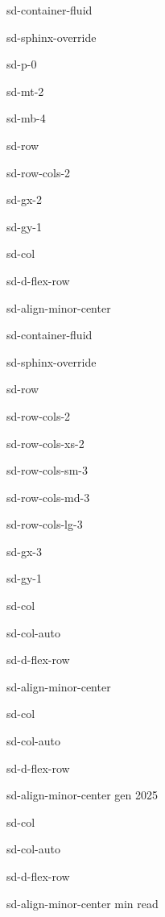 \documentclass[letterpaper,10pt,italian]{jupyterBook}
\begin{document}
\begin{sphinxuseclass}{sd-container-fluid}
\begin{sphinxuseclass}{sd-sphinx-override}
\begin{sphinxuseclass}{sd-p-0}
\begin{sphinxuseclass}{sd-mt-2}
\begin{sphinxuseclass}{sd-mb-4}
\begin{sphinxuseclass}{sd-row}
\begin{sphinxuseclass}{sd-row-cols-2}
\begin{sphinxuseclass}{sd-gx-2}
\begin{sphinxuseclass}{sd-gy-1}
\begin{sphinxuseclass}{sd-col}
\begin{sphinxuseclass}{sd-d-flex-row}
\begin{sphinxuseclass}{sd-align-minor-center}
\begin{sphinxuseclass}{sd-container-fluid}
\begin{sphinxuseclass}{sd-sphinx-override}
\begin{sphinxuseclass}{sd-row}
\begin{sphinxuseclass}{sd-row-cols-2}
\begin{sphinxuseclass}{sd-row-cols-xs-2}
\begin{sphinxuseclass}{sd-row-cols-sm-3}
\begin{sphinxuseclass}{sd-row-cols-md-3}
\begin{sphinxuseclass}{sd-row-cols-lg-3}
\begin{sphinxuseclass}{sd-gx-3}
\begin{sphinxuseclass}{sd-gy-1}
\begin{sphinxuseclass}{sd-col}
\begin{sphinxuseclass}{sd-col-auto}
\begin{sphinxuseclass}{sd-d-flex-row}
\begin{sphinxuseclass}{sd-align-minor-center}
\end{sphinxuseclass}
\end{sphinxuseclass}
\end{sphinxuseclass}
\end{sphinxuseclass}
\begin{sphinxuseclass}{sd-col}
\begin{sphinxuseclass}{sd-col-auto}
\begin{sphinxuseclass}{sd-d-flex-row}
\begin{sphinxuseclass}{sd-align-minor-center}
 gen 2025

\end{sphinxuseclass}
\end{sphinxuseclass}
\end{sphinxuseclass}
\end{sphinxuseclass}
\begin{sphinxuseclass}{sd-col}
\begin{sphinxuseclass}{sd-col-auto}
\begin{sphinxuseclass}{sd-d-flex-row}
\begin{sphinxuseclass}{sd-align-minor-center}
 min read


\end{sphinxuseclass}
\end{sphinxuseclass}
\end{sphinxuseclass}
\end{sphinxuseclass}
\end{sphinxuseclass}
\end{sphinxuseclass}
\end{sphinxuseclass}
\end{sphinxuseclass}
\end{sphinxuseclass}
\end{sphinxuseclass}
\end{sphinxuseclass}
\end{sphinxuseclass}
\end{sphinxuseclass}
\end{sphinxuseclass}
\end{sphinxuseclass}
\end{sphinxuseclass}
\end{sphinxuseclass}
\end{sphinxuseclass}
\end{sphinxuseclass}
\end{sphinxuseclass}
\end{sphinxuseclass}
\end{sphinxuseclass}
\end{sphinxuseclass}
\end{sphinxuseclass}
\end{sphinxuseclass}
\end{sphinxuseclass}
\end{document}
